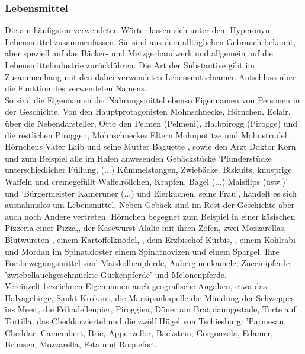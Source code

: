 {\subsubsection{Lebensmittel}

Die am häufigsten verwendeten Wörter lassen sich unter dem Hyperonym Lebensmittel zusammenfassen. Sie sind aus dem alltäglichen Gebrauch bekannt, aber speziell auf das Bäcker- und Metzgerhandwerk und allgemein auf die Lebensmittelindustrie zurückführen. Die Art der Substantive gibt im Zusammenhang mit den dabei verwendeten Lebensmittelnamen Aufschluss über die Funktion des verwendeten Namens. 
\\
So sind die Eigennamen der Nahrungsmittel ebenso Eigennamen von Personen in der Geschichte. Von den Hauptprotagonisten Mohnschnecke,\cite[S.13ff]{pir} Hörnchen,\cite[S.25ff]{pir} Eclair,\cite[S.15ff]{pir} über die Nebendarsteller, Otto den Pelmen (Pelmeni),\cite[S.45ff]{pir} Halbpirogg (Pirogge) und die restlichen Piroggen,\cite[S.33ff]{pir} Mohnschneckes Eltern Mohnpotitze \cite[S.13]{pir} und Mohnstrudel \cite[S.13]{pir}, Hörnchens Vater Laib \cite[S.40]{pir} und seine Mutter Baguette \cite[S.63]{pir}, sowie den Arzt Doktor Korn \cite[S.39]{pir} und zum Beispiel alle im Hafen anwesenden Gebäckstücke 'Plunderstücke unterschiedlicher Füllung, (...) Kümmelstangen, Zwiebäcke. Biskuits, knusprige Waffeln und cremegefüllt Waffelröllchen, Krapfen, Bagel (...) Maisflips (usw.)'\cite[S.38]{pir} und 'Bürgermeister Kameruner (...) und Eierkuchen, seine Frau',\cite[S.189]{pir} handelt es sich ausnahmslos um Lebensmittel. Neben Gebäck sind im Rest der Geschichte aber auch noch Andere vertreten. Hörnchen begegnet zum Beispiel in einer käsischen Pizzeria einer Pizza,\cite[S.171]{pir}, der Käsewurst Alalie mit ihren Zofen, zwei Mozzarellas,\cite[S.179]{pir} Blutwürsten \cite[S.220ff]{pir}, einem Kartoffelknödel, \cite[S.223]{pir}, dem Erzbischof Kürbis, \cite[S.289]{pir}, einem Kohlrabi \cite[S.289]{pir} und Mordan im Spinatkloster einem Spinatnovizen \cite[S.400f]{pir} und einem Spargel.\cite[S.401]{pir} Ihre Fortbewegungsmittel sind Maiskolbenpferde, \cite[S.124]{pir}\cite[S.241]{pir} Auberginenkamele,\cite[S.126]{pir} Zuccinipferde, \cite[S.286]{pir} 'zwiebellauchgeschmückte Gurkenpferde' \cite[S.289]{pir} und Melonenpferde.\cite[S.291]{pir}
\\
Vereinzelt bezeichnen Eigennamen auch geografische Angaben, etwa das Halvagebirge,\cite[S.165]{pir} Sankt Krokant,\cite[S.19ff]{pir} die Marzipankapelle \cite[S.18]{pir} die Mündung der Schweppes ins Meer,\cite[S.187]{pir}, die Frikadellenpier,\cite[S.21]{pir} Piroggien,\cite[S.479ff]{pir} Döner am Bratpfanngestade, \cite[S.381]{pir} Torte auf Tortilla,\cite[S.405]{pir} das Cheddarviertel \cite[S.169]{pir} und die zwölf Hügel von Tschiesburg: \cite[S.165]{pir} 'Parmesan, Cheddar, Camembert, Brie, Appenzeller, Backstein, Gorgonzola, Edamer, Brimsen, Mozzarella, Feta und Roquefort.\cite[S.165]{pir}
}
